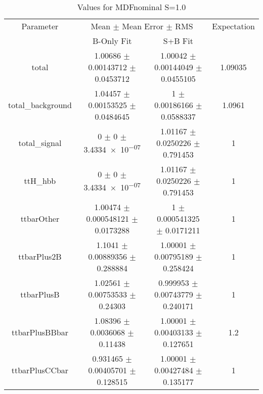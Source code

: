 \begin{table}
\centering
\caption{Values for MDFnominal S=1.0}
\begin{tabular}{cccc}
\toprule
Parameter & \multicolumn{2}{c}{Mean $\pm$ Mean Error $\pm$ RMS} & Expectation\\
 & B-Only Fit & S+B Fit & \\
\midrule
total & \num{1.00686} $\pm$ \num{0.00143712} $\pm$ \num{0.0453712} & \num{1.00042} $\pm$ \num{0.00144049} $\pm$ \num{0.0455105} & \num{1.09035}\\
total\_background & \num{1.04457} $\pm$ \num{0.00153525} $\pm$ \num{0.0484645} & \num{1} $\pm$ \num{0.00186166} $\pm$ \num{0.0588337} & \num{1.0961}\\
total\_signal & \num{0} $\pm$ \num{0} $\pm$ \num{3.4334e-07} & \num{1.01167} $\pm$ \num{0.0250226} $\pm$ \num{0.791453} & \num{1}\\
ttH\_hbb & \num{0} $\pm$ \num{0} $\pm$ \num{3.4334e-07} & \num{1.01167} $\pm$ \num{0.0250226} $\pm$ \num{0.791453} & \num{1}\\
ttbarOther & \num{1.00474} $\pm$ \num{0.000548121} $\pm$ \num{0.0173288} & \num{1} $\pm$ \num{0.000541325} $\pm$ \num{0.0171211} & \num{1}\\
ttbarPlus2B & \num{1.1041} $\pm$ \num{0.00889356} $\pm$ \num{0.288884} & \num{1.00001} $\pm$ \num{0.00795189} $\pm$ \num{0.258424} & \num{1}\\
ttbarPlusB & \num{1.02561} $\pm$ \num{0.00753533} $\pm$ \num{0.24303} & \num{0.999953} $\pm$ \num{0.00743779} $\pm$ \num{0.240171} & \num{1}\\
ttbarPlusBBbar & \num{1.08396} $\pm$ \num{0.0036068} $\pm$ \num{0.11438} & \num{1.00001} $\pm$ \num{0.00403133} $\pm$ \num{0.127651} & \num{1.2}\\
ttbarPlusCCbar & \num{0.931465} $\pm$ \num{0.00405701} $\pm$ \num{0.128515} & \num{1.00001} $\pm$ \num{0.00427484} $\pm$ \num{0.135177} & \num{1}\\
\bottomrule
\end{tabular}
\end{table}